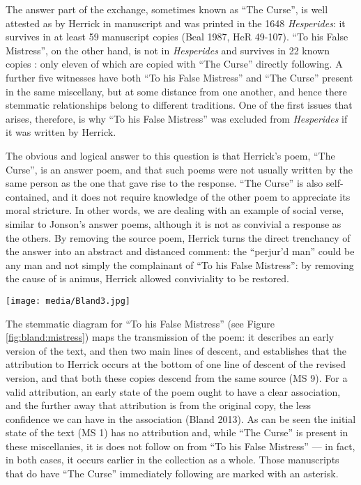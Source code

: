 \begin{paper}
The answer part of the exchange, sometimes known as ``The Curse'', is well
attested as by Herrick in manuscript and was printed in the 1648
\emph{Hesperides}: it survives in at least 59 manuscript copies (Beal
1987, HeR 49-107). ``To his False Mistress'', on the other hand, is not in
\emph{Hesperides} and survives in 22 known copies \citep[HeR 379--400]{beal_index_1987}: only eleven of which are copied with ``The Curse'' directly
following. A further five witnesses have both ``To his False Mistress''
and ``The Curse'' present in the same miscellany, but at some distance
from one another, and hence there stemmatic relationships belong to
different traditions. One of the first issues that arises, therefore, is
why ``To his False Mistress'' was excluded from \emph{Hesperides} if it
was written by Herrick.

The obvious and logical answer to this question is that Herrick's poem, ``The Curse'', is
an answer poem, and that such poems were not usually written by the same
person as the one that gave rise to the response. ``The Curse'' is also
self-contained, and it does not require knowledge of the other poem to
appreciate its moral stricture. In other words, we are dealing with an
example of social verse, similar to Jonson's answer poems, although it
is not as convivial a response as the others. By removing the source
poem, Herrick turns the direct trenchancy of the answer into an abstract
and distanced comment: the ``perjur'd man'' could be any man and not
simply the complainant of ``To his False Mistress'': by removing the cause
of is animus, Herrick allowed conviviality to be restored.

\begin{sidewaysfigure}
    \centering
    \texttt{[image: media/Bland3.jpg]}
    \caption{Anon, ``To his False Mistress''.}
    \label{fig:bland:mistress}
\end{sidewaysfigure}


The stemmatic diagram for ``To his False Mistress'' (see Figure \ref{fig:bland:mistress}) maps the
transmission of the poem: it describes an early version of the text, and
then two main lines of descent, and establishes that the attribution to
Herrick occurs at the bottom of one line of descent of the revised
version, and that both these copies descend from the same source (MS 9).
For a valid attribution, an early state of the poem ought to have a
clear association, and the further away that attribution is from the
original copy, the less confidence we can have in the association (Bland
2013). As can be seen the initial state of the text (MS 1) has no
attribution and, while ``The Curse'' is present in these miscellanies, it
is does not follow on from ``To his False Mistress'' --- in fact, in both
cases, it occurs earlier in the collection as a whole. Those manuscripts
that do have ``The Curse'' immediately following are marked with an
asterisk.


\end{paper}
